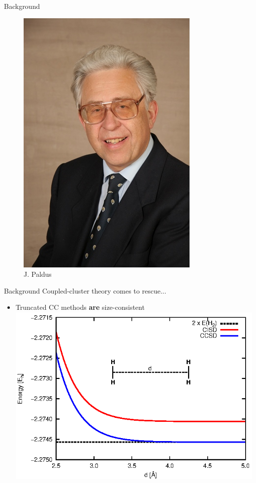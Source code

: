 \documentclass{beamer}
\begin{document}
\begin{frame}{Background}
\begin{multicols}{2}
   \begin{figure}
   \includegraphics[scale=0.33]{figures/Paldus.jpg}\\
   J. Paldus
   \end{figure}
   \end{multicols}
\end{frame}

\begin{frame}{Background}
 Coupled-cluster theory comes to rescue...
 \vspace{10pt}
 \begin{itemize}
  \item Truncated CC methods {\bf are} size-consistent \\
  \vspace{10pt}
  \includegraphics[scale=1.0]{figures/size_extensivity.eps}
 \end{itemize}
\end{frame}
\end{document}
